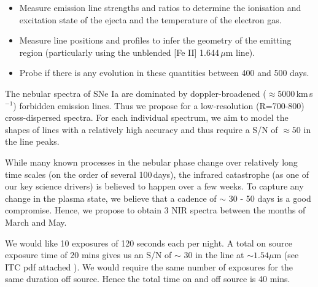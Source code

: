\documentclass[11pt]{article}
\begin{document}
\begin{itemize}
\item Measure emission line strengths and ratios to determine the ionisation and excitation state of the ejecta and the temperature of the electron gas.
\item Measure line positions and profiles to infer the geometry of the emitting region (particularly using the unblended [Fe II] 1.644\,$\mu$m line).
\item Probe if there is any evolution in these quantities between 400 and 500 days.
\end{itemize}

The nebular spectra of SNe Ia are dominated by doppler-broadened ($\approx 5000$\,km\,s$^{-1}$) forbidden emission lines. Thus we propose for a low-resolution (R=700-800) cross-dispersed spectra. For each individual spectrum, we aim to model the shapes of lines with a relatively high accuracy and thus require a S/N of $\approx 50$ in the line peaks. 

While many known processes in the nebular phase change over relatively long time scales (on the order of several 100\,days), the infrared catastrophe (as one of our key science drivers) is believed to happen over a few weeks. To capture any change in the plasma state, we believe that a cadence of  $\sim$ 30 - 50 days is a good compromise. Hence, we propose to obtain 3 NIR spectra between the months of March and May. 

\newpage


%

\technicaldescription    %
We would like 10 exposures of 120 seconds  each per night. A total on source exposure time of 20 mins  gives us an S/N of $\sim$ 30 in the line at $\sim 1.54 \mu$m (see ITC pdf attached ). 
We would require the same number of exposures for the same duration off source. Hence the total time on and off source is 40 mins. 
\end{document}
